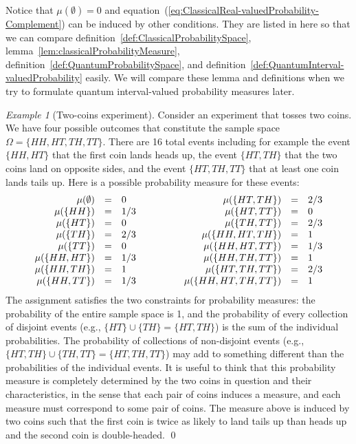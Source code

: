 \documentclass{article}
\theoremstyle{remark}
\newtheorem{example}{Example}
\newcommand{\pmeas}{\ensuremath{\mu}}
\begin{document}
Notice that $\pmeas(\emptyset)=0$ and equation~(\ref{eq:ClassicalReal-valuedProbability-Complement})
can be induced by other conditions. They are listed in here so that
we can compare definition~\ref{def:ClassicalProbabilitySpace}, lemma~\ref{lem:classicalProbabilityMeasure},
definition~\ref{def:QuantumProbabilitySpace}, and definition~\ref{def:QuantumInterval-valuedProbability}
easily. We will compare these lemma and definitions when we try to
formulate quantum interval-valued probability measures later.

\begin{example}[Two-coins experiment]\label{ex1} Consider an
experiment that tosses two coins. We have four possible outcomes that
constitute the sample space $\Omega=\{HH,HT,TH,TT\}$. There are 16
total events including for example the event $\{HH,HT\}$ that the
first coin lands heads up, the event $\{HT,TH\}$ that the two coins
land on opposite sides, and the event $\{HT,TH,TT\}$ that at least
one coin lands tails up. Here is a possible probability measure for
these events: 
\[
\begin{array}{c@{\qquad\qquad}c}
\begin{array}{rcl}
\pmeas(\emptyset) & = & 0\\
\pmeas(\{HH\}) & = & 1/3\\
\pmeas(\{HT\}) & = & 0\\
\pmeas(\{TH\}) & = & 2/3\\
\pmeas(\{TT\}) & = & 0\\
\pmeas(\{HH,HT\}) & = & 1/3\\
\pmeas(\{HH,TH\}) & = & 1\\
\pmeas(\{HH,TT\}) & = & 1/3
\end{array} & \begin{array}{rcl}
\pmeas(\{HT,TH\}) & = & 2/3\\
\pmeas(\{HT,TT\}) & = & 0\\
\pmeas(\{TH,TT\}) & = & 2/3\\
\pmeas(\{HH,HT,TH\}) & = & 1\\
\pmeas(\{HH,HT,TT\}) & = & 1/3\\
\pmeas(\{HH,TH,TT\}) & = & 1\\
\pmeas(\{HT,TH,TT\}) & = & 2/3\\
\pmeas(\{HH,HT,TH,TT\}) & = & 1
\end{array}\end{array}
\]
The assignment satisfies the two constraints for probability measures:
the probability of the entire sample space is 1, and the probability
of every collection of disjoint events (e.g., $\{HT\}\cup\{TH\}=\{HT,TH\}$)
is the sum of the individual probabilities. The probability of collections
of non-disjoint events (e.g., $\{HT,TH\}\cup\{TH,TT\}=\{HT,TH,TT\}$)
may add to something different than the probabilities of the individual
events. It is useful to think that this probability measure is completely
determined by the two coins in question and their characteristics,
in the sense that each pair of coins induces a measure, and each measure
must correspond to some pair of coins. The measure above is induced
by two coins such that the first coin is twice as likely to land tails
up than heads up and the second coin is double-headed. \qed\end{example}
\end{document}
